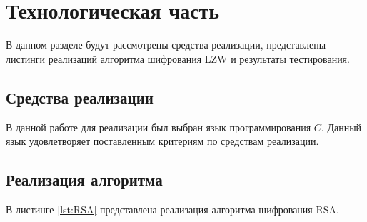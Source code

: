 \chapter{Технологическая часть}

В данном разделе будут рассмотрены средства реализации, представлены листинги реализаций алгоритма шифрования LZW и результаты тестирования.

\section{Средства реализации}

В данной работе для реализации был выбран язык программирования $C$. Данный язык удовлетворяет поставленным критериям по средствам реализации.

\section{Реализация алгоритма}

В листинге \ref{lst:RSA} представлена реализация алгоритма шифрования RSA.

